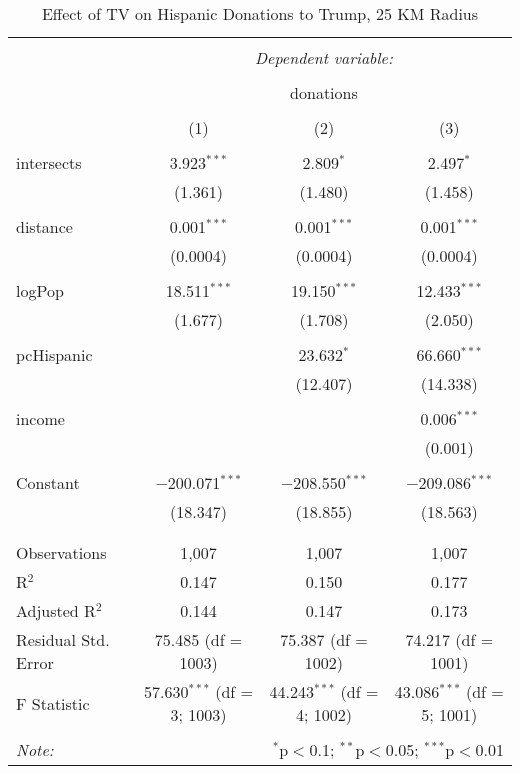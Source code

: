 
\begin{table}[!htbp] \centering 
  \caption{Effect of TV on Hispanic Donations to Trump, 25 KM Radius} 
  \label{} 
\begin{tabular}{@{\extracolsep{5pt}}lccc} 
\\[-1.8ex]\hline 
\hline \\[-1.8ex] 
 & \multicolumn{3}{c}{\textit{Dependent variable:}} \\ 
\cline{2-4} 
\\[-1.8ex] & \multicolumn{3}{c}{donations} \\ 
\\[-1.8ex] & (1) & (2) & (3)\\ 
\hline \\[-1.8ex] 
 intersects & 3.923$^{***}$ & 2.809$^{*}$ & 2.497$^{*}$ \\ 
  & (1.361) & (1.480) & (1.458) \\ 
  & & & \\ 
 distance & 0.001$^{***}$ & 0.001$^{***}$ & 0.001$^{***}$ \\ 
  & (0.0004) & (0.0004) & (0.0004) \\ 
  & & & \\ 
 logPop & 18.511$^{***}$ & 19.150$^{***}$ & 12.433$^{***}$ \\ 
  & (1.677) & (1.708) & (2.050) \\ 
  & & & \\ 
 pcHispanic &  & 23.632$^{*}$ & 66.660$^{***}$ \\ 
  &  & (12.407) & (14.338) \\ 
  & & & \\ 
 income &  &  & 0.006$^{***}$ \\ 
  &  &  & (0.001) \\ 
  & & & \\ 
 Constant & $-$200.071$^{***}$ & $-$208.550$^{***}$ & $-$209.086$^{***}$ \\ 
  & (18.347) & (18.855) & (18.563) \\ 
  & & & \\ 
\hline \\[-1.8ex] 
Observations & 1,007 & 1,007 & 1,007 \\ 
R$^{2}$ & 0.147 & 0.150 & 0.177 \\ 
Adjusted R$^{2}$ & 0.144 & 0.147 & 0.173 \\ 
Residual Std. Error & 75.485 (df = 1003) & 75.387 (df = 1002) & 74.217 (df = 1001) \\ 
F Statistic & 57.630$^{***}$ (df = 3; 1003) & 44.243$^{***}$ (df = 4; 1002) & 43.086$^{***}$ (df = 5; 1001) \\ 
\hline 
\hline \\[-1.8ex] 
\textit{Note:}  & \multicolumn{3}{r}{$^{*}$p$<$0.1; $^{**}$p$<$0.05; $^{***}$p$<$0.01} \\ 
\end{tabular} 
\end{table} 
